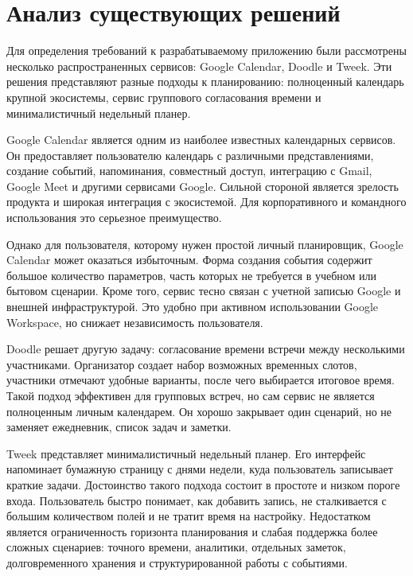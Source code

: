 \documentclass[14pt,a4paper]{extreport}
\begin{document}
\section{Анализ существующих решений}

Для определения требований к разрабатываемому приложению были рассмотрены несколько распространенных сервисов: Google Calendar, Doodle и Tweek. Эти решения представляют разные подходы к планированию: полноценный календарь крупной экосистемы, сервис группового согласования времени и минималистичный недельный планер.

Google Calendar является одним из наиболее известных календарных сервисов. Он предоставляет пользователю календарь с различными представлениями, создание событий, напоминания, совместный доступ, интеграцию с Gmail, Google Meet и другими сервисами Google. Сильной стороной является зрелость продукта и широкая интеграция с экосистемой. Для корпоративного и командного использования это серьезное преимущество.

Однако для пользователя, которому нужен простой личный планировщик, Google Calendar может оказаться избыточным. Форма создания события содержит большое количество параметров, часть которых не требуется в учебном или бытовом сценарии. Кроме того, сервис тесно связан с учетной записью Google и внешней инфраструктурой. Это удобно при активном использовании Google Workspace, но снижает независимость пользователя.

Doodle решает другую задачу: согласование времени встречи между несколькими участниками. Организатор создает набор возможных временных слотов, участники отмечают удобные варианты, после чего выбирается итоговое время. Такой подход эффективен для групповых встреч, но сам сервис не является полноценным личным календарем. Он хорошо закрывает один сценарий, но не заменяет ежедневник, список задач и заметки.

Tweek представляет минималистичный недельный планер. Его интерфейс напоминает бумажную страницу с днями недели, куда пользователь записывает краткие задачи. Достоинство такого подхода состоит в простоте и низком пороге входа. Пользователь быстро понимает, как добавить запись, не сталкивается с большим количеством полей и не тратит время на настройку. Недостатком является ограниченность горизонта планирования и слабая поддержка более сложных сценариев: точного времени, аналитики, отдельных заметок, долговременного хранения и структурированной работы с событиями.
\end{document}
